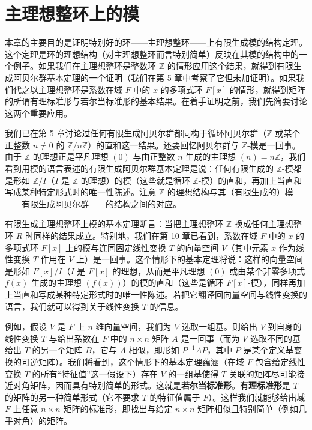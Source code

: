 
\setcounter{chapter}{11}

\chapter{主理想整环上的模}

本章的主要目的是证明特别好的环——主理想整环——上有限生成模的结构定理。这个定理是环的理想结构（对主理想整环而言特别简单）反映在其模的结构中的一个例子。如果我们在主理想整环是整数环 \(\mathbb{Z}\) 的情形应用这个结果，就得到有限生成阿贝尔群基本定理的一个证明（我们在第 5 章中考察了它但未加证明）。如果我们代之以主理想整环是系数在域 \(F\) 中的 \(x\) 的多项式环 \(F[x]\) 的情形，就得到矩阵的所谓有理标准形与若尔当标准形的基本结果。在着手证明之前，我们先简要讨论这两个重要应用。

我们已在第 5 章讨论过任何有限生成阿贝尔群都同构于循环阿贝尔群（\(\mathbb{Z}\) 或某个正整数 \(n \neq 0\) 的 \(\mathbb{Z}/n\mathbb{Z}\)）的直和这一结果。还要回忆阿贝尔群与 \(\mathbb{Z}\)-模是一回事。由于 \(\mathbb{Z}\) 的理想正是平凡理想 \((0)\) 与由正整数 \(n\) 生成的主理想 \((n) = n\mathbb{Z}\)，我们看到用模的语言表述的有限生成阿贝尔群基本定理是说：任何有限生成的 \(\mathbb{Z}\)-模都是形如 \(\mathbb{Z}/I\)（\(I\) 是 \(\mathbb{Z}\) 的理想）的模（这些就是循环 \(\mathbb{Z}\)-模）的直和，再加上当直和写成某种特定形式时的唯一性陈述。注意 \(\mathbb{Z}\) 的理想结构与其（有限生成的）模——有限生成阿贝尔群——的结构之间的对应。

有限生成主理想整环上模的基本定理断言：当把主理想整环 \(\mathbb{Z}\) 换成任何主理想整环 \(R\) 时同样的结果成立。特别地，我们在第 10 章已看到，系数在域 \(F\) 中的 \(x\) 的多项式环 \(F[x]\) 上的模与连同固定线性变换 \(T\) 的向量空间 \(V\)（其中元素 \(x\) 作为线性变换 \(T\) 作用在 \(V\) 上）是一回事。这个情形下的基本定理将说：这样的向量空间是形如 \(F[x]/I\)（\(I\) 是 \(F[x]\) 的理想，从而是平凡理想 \((0)\) 或由某个非零多项式 \(f(x)\) 生成的主理想 \((f(x))\)）的模的直和（这些是循环 \(F[x]\)-模），同样再加上当直和写成某种特定形式时的唯一性陈述。若把它翻译回向量空间与线性变换的语言，我们就可以得到关于线性变换 \(T\) 的信息。

例如，假设 \(V\) 是 \(F\) 上 \(n\) 维向量空间，我们为 \(V\) 选取一组基。则给出 \(V\) 到自身的线性变换 \(T\) 与给出系数在 \(F\) 中的 \(n \times n\) 矩阵 \(A\) 是一回事（而为 \(V\) 选取不同的基给出 \(T\) 的另一个矩阵 \(B\)，它与 \(A\) 相似，即形如 \(P^{-1}AP\)，其中 \(P\) 是某个定义基变换的可逆矩阵）。我们将看到，这个情形下的基本定理蕴涵（在域 \(F\) 包含给定线性变换 \(T\) 的所有“特征值”这一假设下）存在 \(V\) 的一组基使得 \(T\) 关联的矩阵尽可能接近对角矩阵，因而具有特别简单的形式。这就是\textbf{若尔当标准形}。\textbf{有理标准形}是 \(T\) 的矩阵的另一种简单形式（它不要求 \(T\) 的特征值属于 \(F\)）。这样我们就能够给出域 \(F\) 上任意 \(n \times n\) 矩阵的标准形，即找出与给定 \(n \times n\) 矩阵相似且特别简单（例如几乎对角）的矩阵。

